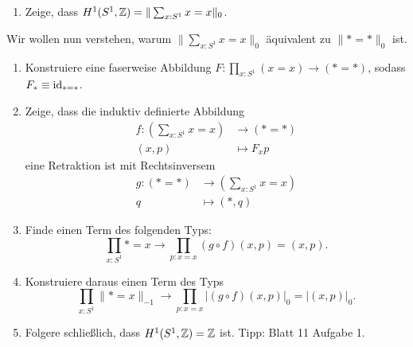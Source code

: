 \documentclass{uebung}
\begin{document}

\begin{exercise}
\end{exercise}

\begin{exercise}
  \begin{enumerate}
    \item Zeige, dass $H^1(S^1,\mathbb{Z}) = \|\sum_{x:S^1} x=x\|_0$.
  \end{enumerate}
  Wir wollen nun verstehen, warum $\|\sum_{x:S^1} x=x\|_0$ äquivalent zu $\|\ast = \ast\|_0$ ist.
  \begin{enumerate}[start=2]
    \item Konstruiere eine faserweise Abbildung $F:\prod_{x:S^1} (x = x) \to (\ast = \ast)$, sodass $F_\ast\equiv\mathrm{id}_{\ast = \ast}$.
    \item Zeige, dass die induktiv definierte Abbildung
      \begin{align*}
        f:\left(\sum_{x:S^1} x=x\right) &\to (\ast=\ast)\\
        (x,p)&\mapsto F_xp
      \end{align*}
      eine Retraktion ist mit Rechtsinversem
      \begin{align*}
        g:(\ast=\ast) &\to \left(\sum_{x:S^1} x=x\right)\\
        q &\mapsto (\ast,q)
      \end{align*}
    \item Finde einen Term des folgenden Typs:
      $$
      \prod_{x:S^1} \ast=x \to \prod_{p:x=x} (g\circ f)(x,p) = (x,p).
      $$
    \item Konstruiere daraus einen Term des Typs
      $$
      \prod_{x:S^1} \|\ast=x\|_{-1} \to \prod_{p:x=x} |(g\circ f)(x,p)|_0 = |(x,p)|_0.
      $$
    \item Folgere schließlich, dass $H^1(S^1,\mathbb{Z}) = \mathbb{Z}$ ist.
      {\tiny Tipp: Blatt 11 Aufgabe 1.}
  \end{enumerate}
\end{exercise}

\begin{exercise}
\end{exercise}
\end{document}
